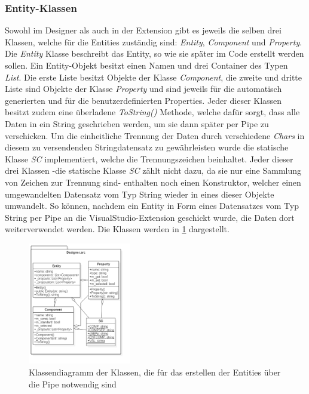 \subsubsection{Entity-Klassen}
\label{entityklassen}
Sowohl im Designer als auch in der Extension gibt es jeweils die selben drei Klassen, welche für die Entities zuständig sind: \textit{Entity}, \textit{Component} und \textit{Property}.
Die \textit{Entity} Klasse beschreibt das Entity, so wie sie später im Code erstellt werden sollen. Ein Entity-Objekt besitzt einen Namen und drei Container des Typen \textit{List}. Die erste Liste besitzt Objekte der Klasse \textit{Component}, die zweite und dritte Liste sind Objekte der Klasse \textit{Property} und sind jeweils für die automatisch generierten und für die benutzerdefinierten Properties.
Jeder dieser Klassen besitzt zudem eine überladene \textit{ToString()} Methode, welche dafür sorgt, dass alle Daten in ein String geschrieben werden, um sie dann später per Pipe zu verschicken.
Um die einheitliche Trennung der Daten durch verschiedene \textit{Chars} in diesem zu versendenden Stringdatensatz zu gewährleisten wurde die statische Klasse \textit{SC} implementiert, welche die Trennungszeichen beinhaltet.
Jeder dieser drei Klassen -die statische Klasse \textit{SC} zählt nicht dazu, da sie nur eine Sammlung von Zeichen zur Trennung sind- enthalten noch einen Konstruktor, welcher einen umgewandelten Datensatz vom Typ String wieder in eines dieser Objekte umwandelt. 
So können, nachdem ein Entity in Form eines Datensatzes vom Typ String per Pipe an die VisualStudio-Extension geschickt wurde, die Daten dort weiterverwendet werden. 
Die Klassen werden in \cref{entityklassendiag} dargestellt.
\begin{figure}
	\begin{center}
		\includegraphics[width=0.4\textwidth]{03unserprogramm/Designer/EntityKlassen.png}
		\caption{Klassendiagramm der Klassen, die für das erstellen der Entities über die Pipe notwendig sind}\label{entityklassendiag}
	\end{center}
\end{figure}

